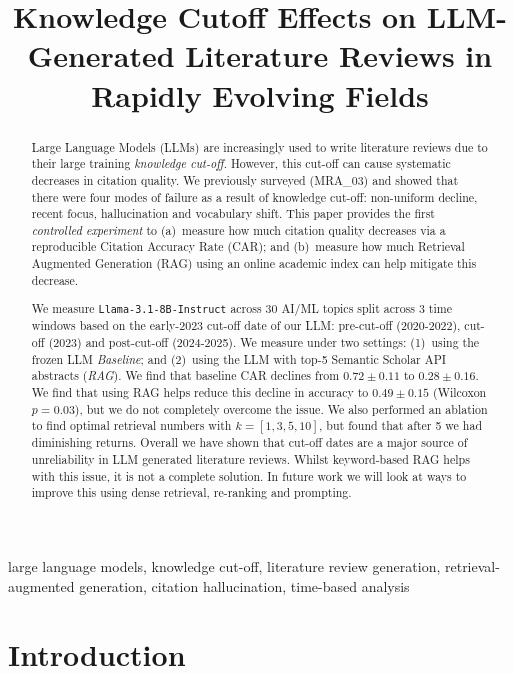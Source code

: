 \documentclass[conference]{IEEEtran}
\title{Knowledge Cutoff Effects on LLM-Generated Literature
Reviews in Rapidly Evolving Fields}
\author{%
  \IEEEauthorblockN{Ankush Gupta}
  \IEEEauthorblockA{%
    M.Tech.\ Information Technology (Robotics and AI)\\
    Roll No.: MRA2026003\\
    AI Tools for Research, IIIT Allahabad, India\\
    \texttt{MRA2026003@iiita.ac.in}}
}
\begin{document}
\maketitle

\begin{abstract}
Large Language Models (LLMs) are increasingly used to write literature reviews due to their large training \emph{knowledge cut-off}. However, this
cut-off can cause systematic decreases in citation quality. We previously surveyed
(MRA\_03) and showed that there were four modes of failure as a result of
knowledge cut-off: non-uniform decline, recent focus, hallucination and
vocabulary shift. This paper provides the first \emph{controlled experiment} to (a)~measure
how much citation quality decreases via a reproducible Citation Accuracy Rate
(CAR); and (b)~measure how much Retrieval Augmented Generation (RAG) using an
online academic index can help mitigate this decrease.

We measure \texttt{Llama-3.1-8B-Instruct} across 30 AI/ML topics split across 3 time windows based on the
early-2023 cut-off date of our LLM: pre-cut-off (2020-2022), cut-off (2023) and
post-cut-off (2024-2025). We measure under two settings: (1)~using the
frozen LLM \emph{Baseline}; and (2)~using the LLM with top-5
Semantic Scholar API abstracts (\emph{RAG}). We find that baseline CAR
declines from $0.72 \pm 0.11$ to $0.28 \pm 0.16$. We find that using
RAG helps reduce this decline in accuracy to $0.49 \pm 0.15$
(Wilcoxon $p = 0.03$), but we do not completely overcome the issue. We
also performed an ablation to find optimal retrieval numbers with
$k = [1,3,5,10]$, but found that after 5 we had diminishing returns. Overall
we have shown that cut-off dates are a major source of unreliability in LLM
generated literature reviews. Whilst keyword-based RAG helps with this issue,
it is not a complete solution. In future work we will look at ways to improve
this using dense retrieval, re-ranking and prompting.
\end{abstract}

\begin{IEEEkeywords}
large language models, knowledge cut-off, literature review generation,
retrieval-augmented generation, citation hallucination, time-based analysis
\end{IEEEkeywords}

\section{Introduction}
\label{sec:intro}
\end{document}
